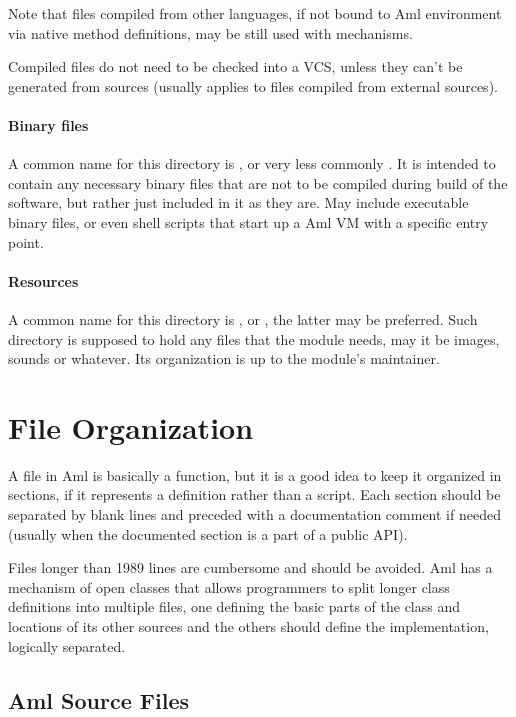 Note that files compiled from other languages, if not bound to Aml environment via native method definitions, may be still used with  mechanisms. 

Compiled files do not need to be checked into a VCS, unless they can't be generated from sources (usually applies to files compiled from external sources). 

\paragraph{Binary files}
A common name for this directory is , or very less commonly . It is intended to contain any necessary binary files that are not to be compiled during build of the software, but rather just included in it as they are. May include executable binary files, or even shell scripts that start up a Aml VM with a specific entry point. 

\paragraph{Resources}
A common name for this directory is , or , the latter may be preferred. Such directory is supposed to hold any files that the module needs, may it be images, sounds or whatever. Its organization is up to the module's maintainer. 





\section{File Organization}

A file in Aml is basically a function, but it is a good idea to keep it organized in sections, if it represents a definition rather than a script. Each section should be separated by blank lines and preceded with a documentation comment if needed (usually when the documented section is a part of a public API). 

Files longer than 1989 lines are cumbersome and should be avoided. Aml has a mechanism of open classes that allows programmers to split longer class definitions into multiple files, one defining the basic parts of the class and locations of its other sources and the others should define the implementation, logically separated. 





\subsection{Aml Source Files}

